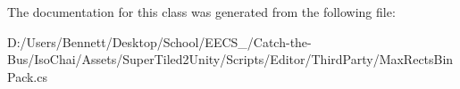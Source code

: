 The documentation for this class was generated from the following file\+:\begin{DoxyCompactItemize}
\item 
D\+:/\+Users/\+Bennett/\+Desktop/\+School/\+E\+E\+C\+S\+\_/\+Catch-\/the-\/\+Bus/\+Iso\+Chai/\+Assets/\+Super\+Tiled2\+Unity/\+Scripts/\+Editor/\+Third\+Party/Max\+Rects\+Bin\+Pack.\+cs\end{DoxyCompactItemize}
